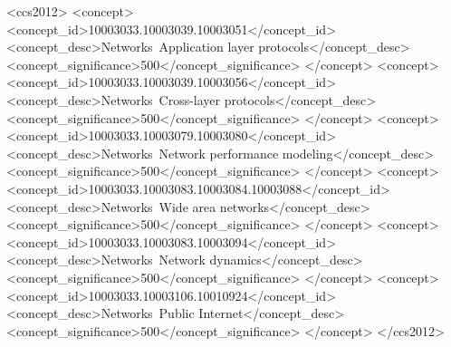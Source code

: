 \documentclass[sigconf, 10pt, screen]{acmart}
\begin{document}
\begin{CCSXML}
<ccs2012>
  <concept>
    <concept_id>10003033.10003039.10003051</concept_id>
    <concept_desc>Networks~Application layer protocols</concept_desc>
    <concept_significance>500</concept_significance>
  </concept>
  <concept>
    <concept_id>10003033.10003039.10003056</concept_id>
    <concept_desc>Networks~Cross-layer protocols</concept_desc>
    <concept_significance>500</concept_significance>
  </concept>
  <concept>
    <concept_id>10003033.10003079.10003080</concept_id>
    <concept_desc>Networks~Network performance modeling</concept_desc>
    <concept_significance>500</concept_significance>
  </concept>
  <concept>
    <concept_id>10003033.10003083.10003084.10003088</concept_id>
    <concept_desc>Networks~Wide area networks</concept_desc>
    <concept_significance>500</concept_significance>
  </concept>
  <concept>
    <concept_id>10003033.10003083.10003094</concept_id>
    <concept_desc>Networks~Network dynamics</concept_desc>
    <concept_significance>500</concept_significance>
  </concept>
  <concept>
    <concept_id>10003033.10003106.10010924</concept_id>
    <concept_desc>Networks~Public Internet</concept_desc>
    <concept_significance>500</concept_significance>
  </concept>
</ccs2012>
\end{CCSXML}



\maketitle










% 

\balance



\end{document}
